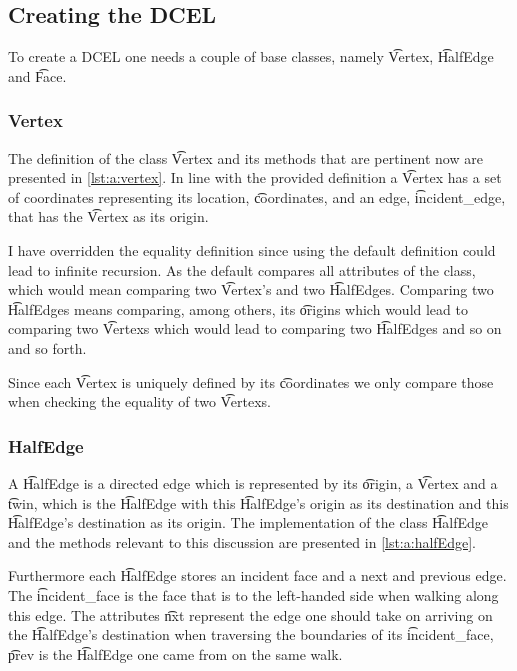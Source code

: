 \subsection{Creating the DCEL}
To create a DCEL one needs a couple of base classes, namely \t{Vertex}, \t{HalfEdge} and \t{Face}. 

\subsubsection*{Vertex}
	The definition of the class \t{Vertex} and its methods that are pertinent now are presented in \autoref{lst:a:vertex}. In line with the provided definition a \t{Vertex} has a set of coordinates representing its location, \t{coordinates}, and an edge, \t{incident_edge}, that has the \t{Vertex} as its origin.

	I have overridden the equality definition since using the default definition could lead to infinite recursion. As the default compares all attributes of the class, which would mean comparing two \t{Vertex}'s and two \t{HalfEdge}s. Comparing two \t{HalfEdge}s means comparing, among others, its \t{origin}s which would lead to comparing two \t{Vertex}s which would lead to comparing two \t{HalfEdge}s and so on and so forth.

	Since each \t{Vertex} is uniquely defined by its \t{coordinates} we only compare those when checking the equality of two \t{Vertex}s.
	

\subsubsection*{HalfEdge}
	A \t{HalfEdge} is a directed edge which is represented by its \t{origin}, a \t{Vertex} and a \t{twin}, which is the \t{HalfEdge} with this \t{HalfEdge}'s origin as its destination and this \t{HalfEdge}'s destination as its origin. The implementation of the class \t{HalfEdge} and the methods relevant to this discussion are presented in \autoref{lst:a:halfEdge}.

	Furthermore each \t{HalfEdge} stores an incident face and a next and previous edge. The \t{incident_face} is the face that is to the left-handed side when walking along this edge. The attributes \t{nxt} represent the edge one should take on arriving on the \t{HalfEdge}'s destination when traversing the boundaries of its \t{incident_face}, \t{prev} is the \t{HalfEdge} one came from on the same walk. 

